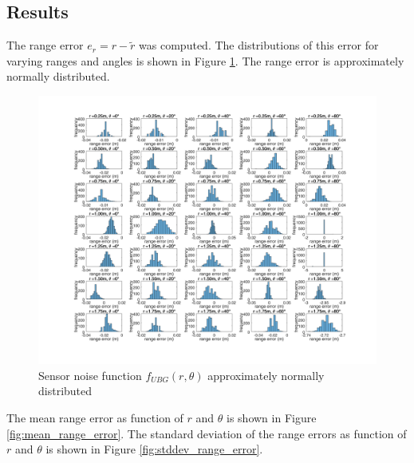 	\subsection{Results}
		The range error $e_r = r - \tilde{r}$ was computed. The distributions of this error for varying ranges and angles is shown in Figure \ref{fig:mean_hist}. The range error is approximately normally distributed.
		\begin{figure}
		\centering
		  \includegraphics[width=1\textwidth,trim = 0mm 0mm 0mm 0mm,clip]{./Figures/range_error_histograms.jpg}
		  \caption{Sensor noise function $f_{UBG}(r,\theta)$ approximately normally distributed}
		  \label{fig:mean_hist}
		\end{figure}
		The mean range error as function of $r$ and $\theta$ is shown in Figure \ref{fig:mean_range_error}. The standard deviation of the range errors as function of $r$ and $\theta$ is shown in Figure \ref{fig:stddev_range_error}.
